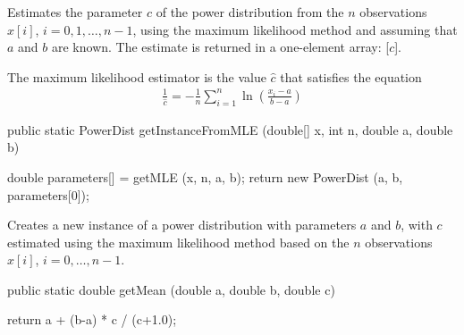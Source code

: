 \begin{tabb}
 Estimates the parameter $c$ of the power distribution from the $n$
   observations $x[i]$, $i = 0, 1, \ldots, n-1$, using the maximum
   likelihood method and assuming that $a$ and $b$ are known.
   The estimate is returned in a one-element array: [$c$].
   \begin{detailed}
   The maximum likelihood estimator is the value
   $\hat{c}$ that satisfies the equation
   \begin{eqnarray*}
     \frac1{\hat c} =  -\frac1n \sum_{i=1}^{n} \ln\left(\frac{x_i - a}{b - a}
    \right)
   \end{eqnarray*}
   \end{detailed}
\end{tabb}
\begin{htmlonly}
\end{htmlonly}
\begin{code}

   public static PowerDist getInstanceFromMLE (double[] x, int n,
                                               double a, double b)\begin{hide} {
      double parameters[] = getMLE (x, n, a, b);
      return new PowerDist (a, b, parameters[0]);
   }\end{hide}
\end{code}
\begin{tabb}
   Creates a new instance of a power distribution with parameters $a$ and $b$,
   with $c$ estimated using the maximum likelihood method based on the
   $n$ observations $x[i]$, $i = 0, \ldots, n-1$.
\end{tabb}
\begin{htmlonly}
\end{htmlonly}
\begin{code}

   public static double getMean (double a, double b, double c)\begin{hide} {
      return a + (b-a) * c / (c+1.0);
   }\end{hide}
\end{code}
